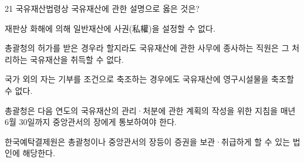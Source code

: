 \begin{question}{21}
국유재산법령상 국유재산에 관한 설명으로 옳은 것은?
\begin{choices}
  \item 재판상 화해에 의해 일반재산에 사권(私權)을 설정할 수 없다.
  \item 총괄청의 허가를 받은 경우라 할지라도 국유재산에 관한 사무에 종사하는 직원은 그 처리하는 국유재산을 취득할 수 없다.
  \item 국가 외의 자는 기부를 조건으로 축조하는 경우에도 국유재산에 영구시설물을 축조할 수 없다.
  \item 총괄청은 다음 연도의 국유재산의 관리·처분에 관한 계획의 작성을 위한 지침을 매년 6월 30일까지 중앙관서의 장에게 통보하여야 한다.
  \item 한국예탁결제원은 총괄청이나 중앙관서의 장등이 증권을 보관·취급하게 할 수 있는 법인에 해당한다.
\end{choices}
\end{question}
